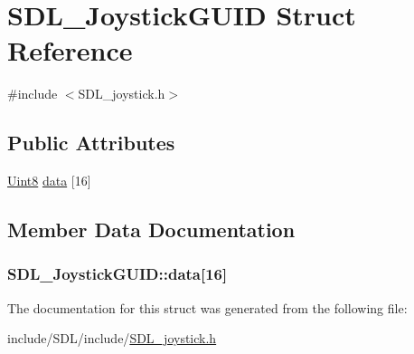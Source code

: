 \hypertarget{struct_s_d_l___joystick_g_u_i_d}{\section{S\-D\-L\-\_\-\-Joystick\-G\-U\-I\-D Struct Reference}
\label{struct_s_d_l___joystick_g_u_i_d}
}


{\ttfamily \#include $<$S\-D\-L\-\_\-joystick.\-h$>$}

\subsection*{Public Attributes}
\begin{DoxyCompactItemize}
\item 
\hyperlink{_s_d_l__stdinc_8h_a2944638813a090aa23e62f4da842c3e2}{Uint8} \hyperlink{struct_s_d_l___joystick_g_u_i_d_a16935b928a608fe98e0509f242590597}{data} \mbox{[}16\mbox{]}
\end{DoxyCompactItemize}


\subsection{Member Data Documentation}
\hypertarget{struct_s_d_l___joystick_g_u_i_d_a16935b928a608fe98e0509f242590597}{
\subsubsection[{data}]{ S\-D\-L\-\_\-\-Joystick\-G\-U\-I\-D\-::data\mbox{[}16\mbox{]}}}\label{struct_s_d_l___joystick_g_u_i_d_a16935b928a608fe98e0509f242590597}


The documentation for this struct was generated from the following file\-:\begin{DoxyCompactItemize}
\item 
include/\-S\-D\-L/include/\hyperlink{_s_d_l__joystick_8h}{S\-D\-L\-\_\-joystick.\-h}\end{DoxyCompactItemize}
